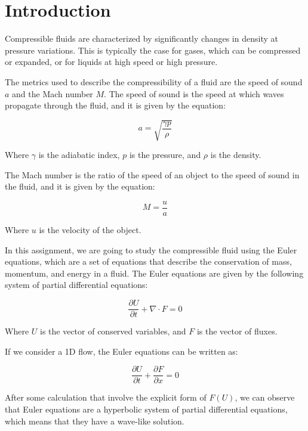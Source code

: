 \section{Introduction}
\label{sec:introduction}

Compressible fluids are characterized by significantly changes in density at pressure variations.
This is typically the case for gases, which can be compressed or expanded, or for liquids at high speed or high pressure.

The metrics used to describe the compressibility of a fluid are the speed of sound $a$ and the Mach number $M$.
The speed of sound is the speed at which waves propagate through the fluid, and it is given by the equation:

\begin{equation}
    a = \sqrt{\frac{\gamma p}{\rho}}
\end{equation}

Where $\gamma$ is the adiabatic index, $p$ is the pressure, and $\rho$ is the density.

The Mach number is the ratio of the speed of an object to the speed of sound in the fluid, and it is given by the equation:

\begin{equation}
    M = \frac{u}{a}
\end{equation}

Where $u$ is the velocity of the object.

In this assignment, we are going to study the compressible fluid using the Euler equations, which are a set of equations that describe the conservation of mass, momentum, and energy in a fluid.
The Euler equations are given by the following system of partial differential equations:

\begin{equation}
    \frac{\partial U}{\partial t} + \nabla \cdot F = 0
\end{equation}

Where $U$ is the vector of conserved variables, and $F$ is the vector of fluxes.

If we consider a 1D flow, the Euler equations can be written as:

\begin{equation}
    \frac{\partial U}{\partial t} + \frac{\partial F}{\partial x} = 0
    \label{eq:euler_equations}
\end{equation}

After some calculation that involve the explicit form of $F(U)$, we can observe that Euler equations are a hyperbolic system of partial differential equations, which means that they have a wave-like solution.

